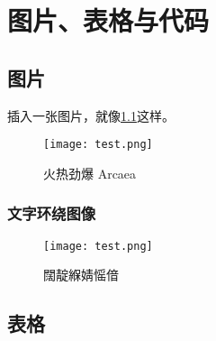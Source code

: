 \chapter{图片、表格与代码}

\section{图片}

插入一张图片，就像\cref{fig:arcaea}这样。

\begin{figure}[htbp]
    \centering
    \texttt{[image: test.png]}
    \caption{火热劲爆 Arcaea}
    \label{fig:arcaea}
\end{figure}
\zhlipsum[3][name=xiangyu]

\subsection{文字环绕图像}
\begin{wrapfigure}{r}{0cm}
    \label{fig:arcaeaedge}
    \texttt{[image: test.png]}
    \caption{闊靛緥婧愮偣}
\end{wrapfigure}
\zhlipsum[2][name=xiangyu]

    
\section{表格}

